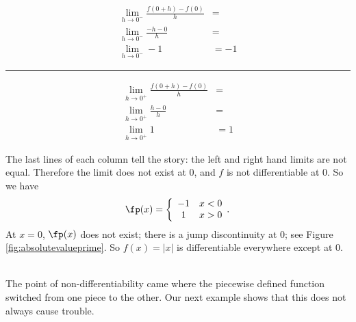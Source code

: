 {\noindent\begin{minipage}[b]{.5\linewidth}
\begin{align*}
\lim_{h\to0^-}\frac{f(0+h)-f(0)}{h} &= \\
\lim_{h\to0^-}\frac{-h-0}{h} &= \\
\lim_{h\to0^-}-1 & =-1
\end{align*}
\end{minipage}\rule{.5pt}{70pt}
\begin{minipage}[b]{.5\linewidth}
\begin{align*}
\lim_{h\to0^+}\frac{f(0+h)-f(0)}{h} &= \\
\lim_{h\to0^+}\frac{h-0}{h} &= \\
\lim_{h\to0^+}1 & =1
\end{align*}
\end{minipage}
%		
%		
The last lines of each column tell the story: the left and right hand limits are not equal. Therefore the limit does not exist at 0, and $f$ is not differentiable at 0.
So we have $$\fp(x) = \left\{\begin{array}{cc} -1 & x<0 \\ 1 & x>0\end{array}.\right.$$ 
At $x=0$, $\fp(x)$ does not exist; there is a jump discontinuity at 0; see Figure \ref{fig:absolutevalueprime}. So $f(x) = |x|$ is differentiable everywhere except at 0. 
}\\

The point of non-differentiability came where the piecewise defined function switched from one piece to the other. Our next example shows that this does not always cause trouble.\\

